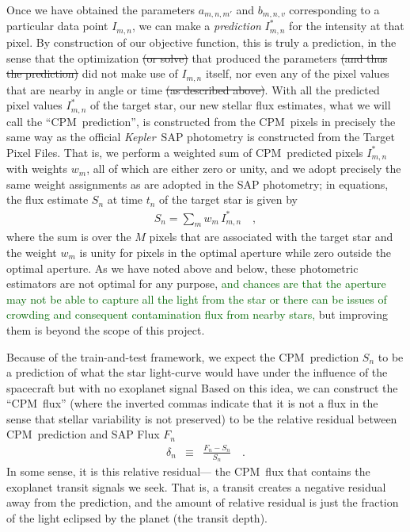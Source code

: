 \documentclass[12pt, preprint]{aastex}
\newcommand{\project}[1]{\textsl{#1}}
\newcommand{\Kepler}{\project{Kepler}}
\newcommand{\name}{CPM}
\newcommand{\revise}[1]{\textcolor{darkgreen}{#1}}
\newcommand{\remove}[1]{\sout{#1}}
\begin{document}
Once we have obtained the parameters $a_{m,n,m'}$ and $b_{m,n,v}$ corresponding to a particular data point $I_{m,n}$,
  we can make a \emph{prediction} $I^{\ast}_{m,n}$ for the intensity at that pixel.
By construction of our objective function, this is truly a prediction,
  in the sense that the optimization \remove{(or solve)} that produced the parameters
  \remove{(and thus the prediction)}
  did not make use of $I_{m,n}$ itself,
  nor even any of the pixel values that are nearby in angle or time
  \remove{(as described above)}.
  With all the predicted pixel values $I^{\ast}_{m,n}$ of the target star,  
  our new stellar flux estimates,
  what we will call the ``\name\ prediction'',
  is constructed from the \name\ pixels
  in precisely the same way as the official \Kepler\ SAP photometry
  is constructed from the Target Pixel Files.
That is, we perform a weighted sum of \name\ predicted pixels $I^{\ast}_{m,n}$ with weights $w_m$,
  all of which are either zero or unity,
  and we adopt precisely the same weight assignments as are adopted in the SAP photometry;
  in equations, the flux estimate $S_n$ at time $t_n$ of the target star is given by
\begin{eqnarray}
S_n = \sum_m w_m\,I^{\ast}_{m,n}
\quad ,
\end{eqnarray}
where the sum is over the $M$ pixels that are associated with the target star and the weight $w_m$ is unity for pixels in the optimal
aperture while zero outside the optimal aperture.
As we have noted above and below, these photometric estimators are not optimal for any purpose, \revise{and chances are that the aperture may not be able to capture all the light from the star or there can be issues of crowding and consequent contamination flux from nearby stars,}
  but improving them is beyond the scope of this project.

Because of the train-and-test framework,  
  we expect the \name\ prediction $S_{n}$ to be a prediction of
  what the star light-curve would have under the influence of the spacecraft but with no exoplanet signal 
Based on this idea, 
  we can construct the ``\name\ flux'' 
  (where the inverted commas indicate that it is not a flux in the sense that stellar variability is not preserved) 
  to be the relative residual between \name\ prediction and SAP Flux $F_{n}$
\begin{eqnarray}
\delta_{n}&\equiv&\frac{F_{n} - S_{n}}{S_{n}}
\quad .
\end{eqnarray} 
In some sense, it is this relative residual--- the \name\ flux that contains the exoplanet transit signals we seek. 
That is, a transit creates a negative residual away from the prediction, 
  and the amount of relative residual is just the fraction of the light eclipsed by the planet (the transit depth). 
\end{document}
